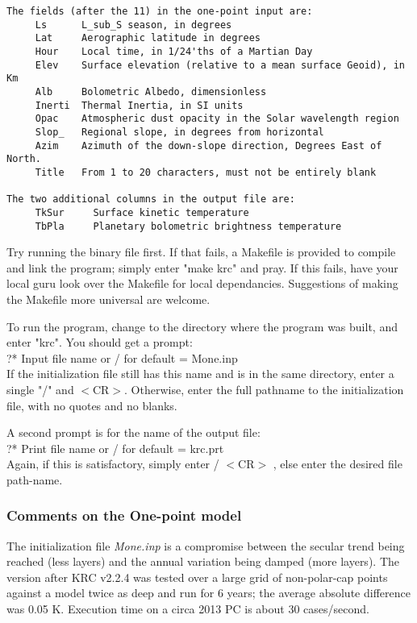 \documentclass[draft]{article}  %
\newcommand{\qi}{\\ \hspace*{2.em}}      %
\newcommand{\nf}{\textit}  %
\begin{document}
\vspace{-3.mm} 
\begin{verbatim}
The fields (after the 11) in the one-point input are:
     Ls      L_sub_S season, in degrees
     Lat     Aerographic latitude in degrees
     Hour    Local time, in 1/24'ths of a Martian Day
     Elev    Surface elevation (relative to a mean surface Geoid), in Km
     Alb     Bolometric Albedo, dimensionless
     Inerti  Thermal Inertia, in SI units
     Opac    Atmospheric dust opacity in the Solar wavelength region
     Slop_   Regional slope, in degrees from horizontal
     Azim    Azimuth of the down-slope direction, Degrees East of North.
     Title   From 1 to 20 characters, must not be entirely blank

The two additional columns in the output file are:
     TkSur     Surface kinetic temperature
     TbPla     Planetary bolometric brightness temperature
\end{verbatim}

Try running the binary file first. If that fails, a Makefile is provided to
compile and link the program; simply enter "make krc" and pray. If this fails,
have your local guru look over the Makefile for local dependancies. Suggestions
of making the Makefile more universal are welcome.

To run the program, change to the directory where the program was built, and
enter "krc". You should get a prompt:
 \qi      ?* Input file name or / for default = Mone.inp  \\
If the initialization file still has this name and is in the same directory,
enter a single "/" and $<$CR$>$. Otherwise, enter the full pathname to the 
initialization file, with no quotes and no blanks.

A second prompt is for the name of the output file: 
 \qi         ?* Print file name or / for default = krc.prt \\
Again, if this is satisfactory, simply enter  / $<$CR$>$ , else enter the desired
file path-name.

\subsubsection{ Comments on the One-point model} %

The initialization file \nf{Mone.inp} is a compromise between the secular trend
being reached (less layers) and the annual variation being damped (more
layers). The version after KRC v2.2.4 was tested over a large grid of
non-polar-cap points against a model twice as deep and run for 6 years; the
average absolute difference was 0.05 K. Execution time on a circa 2013 PC is
about 30 cases/second.
\end{document}
